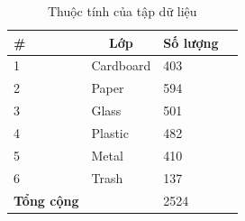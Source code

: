 \documentclass[../the.tex]{subfiles}
\begin{document}
\begin{table}[!ht]
	\centering
	\caption{Thuộc tính của tập dữ liệu}
	\begin{tabular}{|p{2cm}|p{4cm}|p{3.5cm}|p{2cm}|}
		\hline
		\multicolumn{1}{|l|}{
		\textbf{\#}} 
		& \multicolumn{1}{c|}{\textbf{Lớp}} 
		& \multicolumn{1}{c|}{\textbf{Số lượng}} \\
		\hline
	
		 1
		& Cardboard 
		& 403\\
		\hline
		
		 2
		& Paper
		& 594\\
		\hline
		
		 3
		& Glass
		& 501\\
        \hline
        
		 4
		& Plastic
		& 482 \\
        \hline
        
		 5
		& Metal
		& 410\\
        \hline
        
		 6
		& Trash
		& 137 \\
        \hline
  
        
		 \textbf{Tổng cộng}
		& 
		& 2524 \\
		\hline
	\end{tabular}
	
	\label{tab:dataset}
\end{table}
\end{document}
